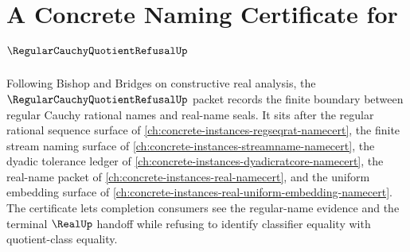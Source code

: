 \chapter{A Concrete Naming Certificate for $\RegularCauchyQuotientRefusalUp$}
\label{ch:concrete-instances-regular-cauchy-quotient-refusal-namecert}

Following Bishop and Bridges on constructive real analysis, the $\RegularCauchyQuotientRefusalUp$ packet records the finite boundary between regular Cauchy rational names and real-name seals. It sits after the regular rational sequence surface of \autoref{ch:concrete-instances-regseqrat-namecert}, the finite stream naming surface of \autoref{ch:concrete-instances-streamname-namecert}, the dyadic tolerance ledger of \autoref{ch:concrete-instances-dyadicratcore-namecert}, the real-name packet of \autoref{ch:concrete-instances-real-namecert}, and the uniform embedding surface of \autoref{ch:concrete-instances-real-uniform-embedding-namecert}. The certificate lets completion consumers see the regular-name evidence and the terminal $\RealUp$ handoff while refusing to identify classifier equality with quotient-class equality.

